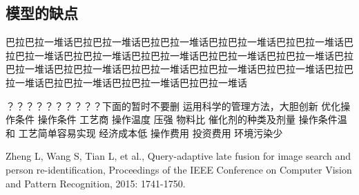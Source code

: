 \documentclass[bwprint]{gmcmthesis}
\begin{document}
\FloatBarrier
\subsection{模型的缺点}
巴拉巴拉一堆话巴拉巴拉一堆话巴拉巴拉一堆话巴拉巴拉一堆话巴拉巴拉一堆话巴拉巴拉一堆话巴拉巴拉一堆话巴拉巴拉一堆话巴拉巴拉一堆话巴拉巴拉一堆话巴拉巴拉一堆话巴拉巴拉一堆话巴拉巴拉一堆话巴拉巴拉一堆话巴拉巴拉一堆话巴拉巴拉一堆话巴拉巴拉一堆话巴拉巴拉一堆话巴拉巴拉一堆话







？？？？？？？？？？下面的暂时不要删
运用科学的管理方法，大胆创新 优化操作条件 操作条件 工艺商
操作温度 压强 物料比 催化剂的种类及剂量 
操作条件温和 工艺简单容易实现 经济成本低 操作费用 投资费用 环境污染少 

\newpage



\begin{thebibliography}{99}  
Zheng L, Wang S, Tian L, et al., Query-adaptive late fusion for image search and person re-identification, Proceedings of the IEEE Conference on Computer Vision and Pattern Recognition, 2015: 1741-1750.  
\end{thebibliography}
\end{document}
